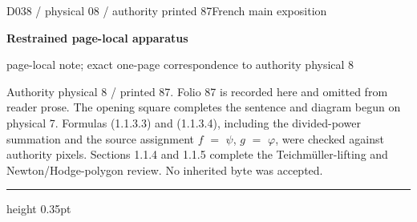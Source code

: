 \documentclass[9pt]{article}
\newcommand{\CanonText}[1]{\par{\fontsize{8.0}{9.35}\selectfont\RaggedRight #1\par}\vspace{2.2pt}}
\newcommand{\LayerTitle}{Restrained page-local apparatus}
\begin{document}
\noindent\begin{minipage}[t][\dimexpr\textheight-5pt\relax][t]{\textwidth}
{\sffamily\fontsize{7.3}{8.2}\selectfont\color{Quiet} D038 / physical 08 / authority printed 87\hfill French main exposition}
\par{}\vspace{4.5pt}
{\sffamily\fontsize{10.4}{11.6}\selectfont\bfseries\color{Accent} \LayerTitle}
\par{\sffamily\fontsize{6.7}{7.7}\selectfont\color{Quiet} page-local note; exact one-page correspondence to authority physical 8}
\vspace{5pt}
\CanonText{Authority physical 8 / printed 87. Folio 87 is recorded here and omitted from reader prose. The opening square completes the sentence and diagram begun on physical 7. Formulas (1.1.3.3) and (1.1.3.4), including the divided-power summation and the source assignment \(f\) \(=\) \(\psi{}\), \(g\) \(=\) \(\varphi{}\), were checked against authority pixels. Sections 1.1.4 and 1.1.5 complete the Teichmüller-lifting and Newton/Hodge-polygon review. No inherited byte was accepted.}
\vfill
{\color{Accent}\hrule height 0.35pt}\vspace{3pt}
\end{minipage}
\newpage
\end{document}
